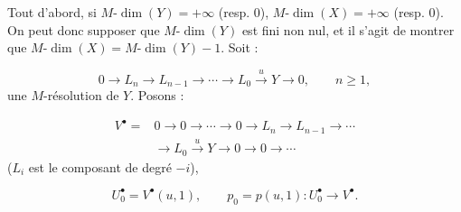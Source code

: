 Tout d'abord, si $M\text{-}\dim(Y)=+\infty$ (resp. $0$),
$M\text{-}\dim(X)=+\infty$ (resp. $0$). On peut donc supposer que
$M\text{-}\dim(Y)$ est fini non nul, et il s'agit de montrer que
$M\text{-}\dim(X)=M\text{-}\dim(Y)-1$. Soit :

\[
0\longrightarrow L_n\longrightarrow L_{n-1}\longrightarrow\cdots
\longrightarrow L_0\xrightarrow{u}Y\longrightarrow0,
\qquad n\geq1,
\]
une $M$-résolution de $Y$. Posons :

\[
\begin{aligned}
V^\bullet={}&0\longrightarrow0\longrightarrow\cdots\longrightarrow0
\longrightarrow L_n\longrightarrow L_{n-1}\longrightarrow\cdots\\
&\longrightarrow L_0\xrightarrow{u}Y\longrightarrow0
\longrightarrow0\longrightarrow\cdots
\end{aligned}
\]
($L_i$ est le composant de degré $-i$),

\[
U_0^\bullet=V^\bullet(u,1),
\qquad
p_0=p(u,1)\colon U_0^\bullet\longrightarrow V^\bullet.
\]
\endgroup
